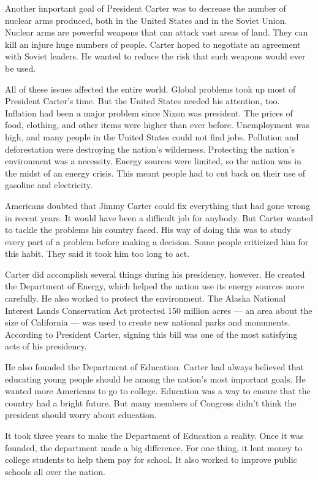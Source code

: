 \documentclass{article}
\begin{document}
Another important goal of President Carter was to decrease the number of nuclear arms produced, both in the United States and in the Soviet Union. Nuclear arms are powerful weapons that can attack vast areas of land. They can kill an injure huge numbers of people. Carter hoped to negotiate an agreement with Soviet leaders. He wanted to reduce the risk that such weapons would ever be used.

All of these issues affected the entire world. Global problems took up most of President Carter's time. But the United States needed his attention, too. Inflation had been a major problem since Nixon was president. The prices of food, clothing, and other items were higher than ever before. Unemployment was high, and many people in the United States could not find jobs. Pollution and deforestation were destroying the nation's wilderness. Protecting the nation's environment was a necessity. Energy sources were limited, so the nation was in the midst of an energy crisis. This meant people had to cut back on their use of gasoline and electricity.

Americans doubted that Jimmy Carter could fix everything that had gone wrong in recent years. It would have been a difficult job for anybody. But Carter wanted to tackle the problems his country faced. His way of doing this was to study every part of a problem before making a decision. Some people criticized him for this habit. They said it took him too long to act.

Carter did accomplish several things during his presidency, however.  He created the Department of Energy, which helped the nation use its energy sources more carefully. He also worked to protect the environment. The Alaska National Interest Lands Conservation Act protected 150 million acres --- an area about the size of California --- was used to create new national parks and monuments. According to President Carter, signing this bill was one of the most satisfying acts of his presidency.

He also founded the Department of Education. Carter had always believed that educating young people should be among the nation's most important goals. He wanted more Americans to go to college. Education was a way to ensure that the country had a bright future. But many members of Congress didn't think the president should worry about education.

It took three years to make the Department of Education a reality. Once it was founded, the department made a big difference. For one thing, it lent money to college students to help them pay for school. It also worked to improve public schools all over the nation.
\end{document}
